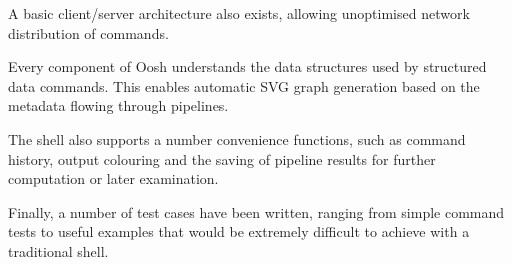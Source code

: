 \documentclass[a4paper]{article}
\begin{document}
A basic client/server architecture also exists, allowing unoptimised network
distribution of commands.

Every component of Oosh understands the data structures used by structured data
commands. This enables automatic SVG graph generation based on the metadata
flowing through pipelines.

The shell also supports a number convenience functions, such as command history,
output colouring and the saving of pipeline results for further computation or
later examination.

Finally, a number of test cases have been written, ranging from simple command
tests to useful examples that would be extremely difficult to achieve with a
traditional shell.
\end{document}
